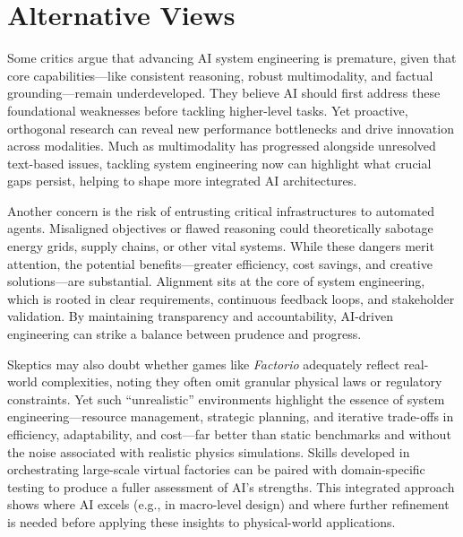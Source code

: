 \section{Alternative Views}

Some critics argue that advancing AI system engineering is premature, given that core capabilities—like consistent reasoning, robust multimodality, and factual grounding—remain underdeveloped. They believe AI should first address these foundational weaknesses before tackling higher-level tasks. Yet proactive, orthogonal research can reveal new performance bottlenecks and drive innovation across modalities. Much as multimodality has progressed alongside unresolved text-based issues, tackling system engineering now can highlight what crucial gaps persist, helping to shape more integrated AI architectures.

Another concern is the risk of entrusting critical infrastructures to automated agents. Misaligned objectives or flawed reasoning could theoretically sabotage energy grids, supply chains, or other vital systems. While these dangers merit attention, the potential benefits—greater efficiency, cost savings, and creative solutions—are substantial. Alignment sits at the core of system engineering, which is rooted in clear requirements, continuous feedback loops, and stakeholder validation. By maintaining transparency and accountability, AI-driven engineering can strike a balance between prudence and progress.

Skeptics may also doubt whether games like \textit{Factorio} adequately reflect real-world complexities, noting they often omit granular physical laws or regulatory constraints. Yet such “unrealistic” environments highlight the essence of system engineering—resource management, strategic planning, and iterative trade-offs in efficiency, adaptability, and cost—far better than static benchmarks and without the noise associated with realistic physics simulations. Skills developed in orchestrating large-scale virtual factories can be paired with domain-specific testing to produce a fuller assessment of AI’s strengths. This integrated approach shows where AI excels (e.g., in macro-level design) and where further refinement is needed before applying these insights to physical-world applications.